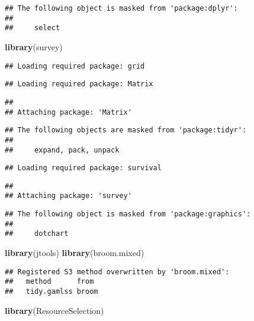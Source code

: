 \documentclass[
]{article}
\newenvironment{Shaded}{\begin{snugshade}}{\end{snugshade}}
\newcommand{\KeywordTok}[1]{\textcolor[rgb]{0.13,0.29,0.53}{\textbf{#1}}}
\newcommand{\NormalTok}[1]{#1}
\begin{document}
\begin{verbatim}
## The following object is masked from 'package:dplyr':
## 
##     select
\end{verbatim}

\begin{Shaded}
\begin{Highlighting}[]
\KeywordTok{library}\NormalTok{(survey)}
\end{Highlighting}
\end{Shaded}

\begin{verbatim}
## Loading required package: grid
\end{verbatim}

\begin{verbatim}
## Loading required package: Matrix
\end{verbatim}

\begin{verbatim}
## 
## Attaching package: 'Matrix'
\end{verbatim}

\begin{verbatim}
## The following objects are masked from 'package:tidyr':
## 
##     expand, pack, unpack
\end{verbatim}

\begin{verbatim}
## Loading required package: survival
\end{verbatim}

\begin{verbatim}
## 
## Attaching package: 'survey'
\end{verbatim}

\begin{verbatim}
## The following object is masked from 'package:graphics':
## 
##     dotchart
\end{verbatim}

\begin{Shaded}
\begin{Highlighting}[]
\KeywordTok{library}\NormalTok{(jtools)}
\KeywordTok{library}\NormalTok{(broom.mixed)}
\end{Highlighting}
\end{Shaded}

\begin{verbatim}
## Registered S3 method overwritten by 'broom.mixed':
##   method      from 
##   tidy.gamlss broom
\end{verbatim}

\begin{Shaded}
\begin{Highlighting}[]
\KeywordTok{library}\NormalTok{(ResourceSelection)}
\end{Highlighting}
\end{Shaded}
\end{document}
